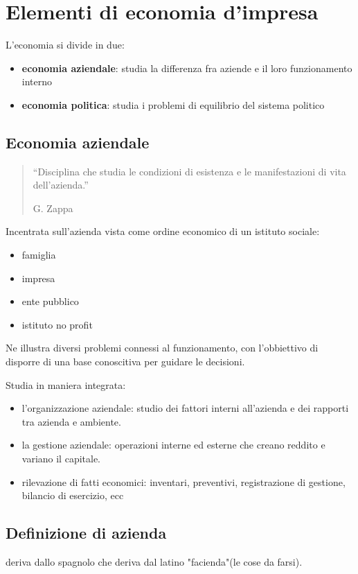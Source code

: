 \chapter{Elementi di economia d'impresa}
L'economia si divide in due:
\begin{itemize}
    \item \textbf{economia aziendale}: studia la differenza fra aziende e il loro funzionamento interno
    \item \textbf{economia politica}: studia i problemi di equilibrio del sistema politico
\end{itemize}

\section{Economia aziendale}
\begin{quotation}
    ``Disciplina che studia le condizioni di esistenza e le manifestazioni di vita dell'azienda.''

    G. Zappa
\end{quotation}

Incentrata sull'azienda vista come ordine economico di un istituto sociale:
\begin{itemize}
    \item famiglia
    \item impresa
    \item ente pubblico
    \item istituto no profit
\end{itemize}

Ne illustra diversi problemi connessi al funzionamento, con l'obbiettivo di disporre di una base conoscitiva
per guidare le decisioni.

Studia in maniera integrata:
\begin{itemize}
	\item l'organizzazione aziendale: studio dei fattori interni all'azienda e dei rapporti tra azienda
		e ambiente.
	\item la gestione aziendale: operazioni interne ed esterne che creano reddito e variano il capitale.
	\item rilevazione di fatti economici: inventari, preventivi, registrazione di gestione, bilancio di esercizio,
		ecc
\end{itemize}

\section{Definizione di azienda}
deriva dallo spagnolo che deriva dal latino "facienda"(le cose da farsi).

